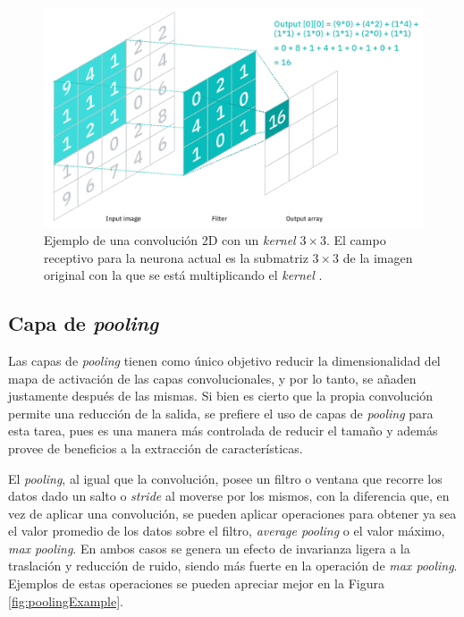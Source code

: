 \begin{figure}[h]
    \centering
    \includegraphics[width=\linewidth]{imagenes/theory/convolution.png}
    \caption[Ejemplo del operador de convolución]{Ejemplo de una convolución 2D con un \textit{kernel} $3 \times 3$. El campo receptivo para la neurona actual es la submatriz $3\times3$ de la imagen original con la que se está multiplicando el \textit{kernel} \cite{noauthor_what_2021}.}
    \label{fig:convolution}
\end{figure}

\subsection{Capa de \textit{pooling}}

Las capas de \textit{pooling} tienen como único objetivo reducir la dimensionalidad del mapa de activación de las capas convolucionales, y por lo tanto, se añaden justamente después de las mismas. Si bien es cierto que la propia convolución permite una reducción de la salida, se prefiere el uso de capas de \textit{pooling} para esta tarea, pues es una manera más controlada de reducir el tamaño y además provee de beneficios a la extracción de características.

El \textit{pooling}, al igual que la convolución, posee un filtro o ventana que recorre los datos dado un salto o \textit{stride} al moverse por los mismos, con la diferencia que, en vez de aplicar una convolución, se pueden aplicar operaciones para obtener ya sea el valor promedio de los datos sobre el filtro, \textit{average pooling} o el valor máximo, \textit{max pooling}. En ambos casos se genera un efecto de invarianza ligera a la traslación y reducción de ruido, siendo más fuerte en la operación de \textit{max pooling}. Ejemplos de estas operaciones se pueden apreciar mejor en la Figura \ref{fig:poolingExample}.


